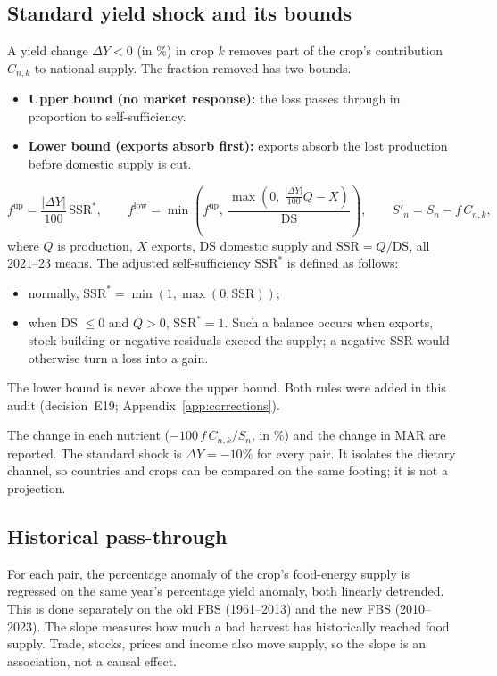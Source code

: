 \subsection{Standard yield shock and its bounds}\label{sec:shockmethod}
A yield change $\Delta Y<0$ (in \%) in crop $k$ removes part of the crop's contribution $C_{n,k}$ to national
supply. The fraction removed has two bounds.
\begin{itemize}
\item \textbf{Upper bound (no market response):} the loss passes through in proportion to self-sufficiency.
\item \textbf{Lower bound (exports absorb first):} exports absorb the lost production before domestic supply is
cut.
\end{itemize}
\begin{equation}\label{eq:shock}
f^{\text{up}} = \frac{|\Delta Y|}{100}\,\text{SSR}^{*},\qquad
f^{\text{low}} = \min\!\left(f^{\text{up}},\ \frac{\max\left(0,\ \tfrac{|\Delta Y|}{100}Q - X\right)}{\text{DS}}\right),\qquad
S'_n = S_n - f\,C_{n,k},
\end{equation}
where $Q$ is production, $X$ exports, DS domestic supply and $\text{SSR}=Q/\text{DS}$, all 2021--23 means. The
adjusted self-sufficiency $\text{SSR}^{*}$ is defined as follows:
\begin{itemize}
\item normally, $\text{SSR}^{*}=\min(1,\max(0,\text{SSR}))$;
\item when DS $\le0$ and $Q>0$, $\text{SSR}^{*}=1$. Such a balance occurs when exports, stock building or negative
residuals exceed the supply; a negative SSR would otherwise turn a loss into a gain.
\end{itemize}
The lower bound is never above the upper bound. Both rules were added in this audit (decision~E19;
Appendix~\ref{app:corrections}).

The change in each nutrient ($-100\,f\,C_{n,k}/S_n$, in \%) and the change in MAR are reported. The standard
shock is $\Delta Y=-10\%$ for every pair. It isolates the dietary channel, so countries and crops can be compared
on the same footing; it is not a projection.

\subsection{Historical pass-through}
For each pair, the percentage anomaly of the crop's food-energy supply is regressed on the same year's
percentage yield anomaly, both linearly detrended. This is done separately on the old FBS (1961--2013) and the
new FBS (2010--2023). The slope measures how much a bad harvest has historically reached food supply. Trade,
stocks, prices and income also move supply, so the slope is an association, not a causal effect.

